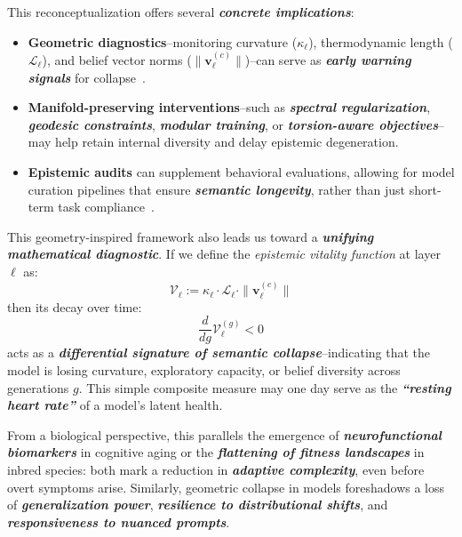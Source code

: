 \vspace{0.5em}
\noindent This reconceptualization offers several \textbf{\emph{concrete implications}}:

\begin{itemize}[leftmargin=1.5em]
    \item \textbf{Geometric diagnostics}--monitoring curvature ($\kappa_\ell$), thermodynamic length ($\mathcal{L}_\ell$), and belief vector norms ($\|\mathbf{v}_\ell^{(c)}\|$)--can serve as \textbf{\emph{early warning signals}} for collapse~\citep{wu2024seamless}.
    
    \item \textbf{Manifold-preserving interventions}--such as \textbf{\emph{spectral regularization}}, \textbf{\emph{geodesic constraints}}, \textbf{\emph{modular training}}, or \textbf{\emph{torsion-aware objectives}}--may help retain internal diversity and delay epistemic degeneration.
    
    \item \textbf{Epistemic audits} can supplement behavioral evaluations, allowing for model curation pipelines that ensure \textbf{\emph{semantic longevity}}, rather than just short-term task compliance~\citep{bommasani2023foundation, ganguli2023reducing}.
\end{itemize}

\vspace{0.5em}
\noindent This geometry-inspired framework also leads us toward a \textbf{\emph{unifying mathematical diagnostic}}. If we define the \emph{epistemic vitality function} at layer $\ell$ as:
\[
\mathcal{V}_\ell := \kappa_\ell \cdot \mathcal{L}_\ell \cdot \|\mathbf{v}_\ell^{(c)}\|
\]
then its decay over time:
\[
\frac{d}{dg} \mathcal{V}_\ell^{(g)} < 0
\]
acts as a \textbf{\emph{differential signature of semantic collapse}}--indicating that the model is losing curvature, exploratory capacity, or belief diversity across generations $g$. This simple composite measure may one day serve as the \textbf{\emph{“resting heart rate”}} of a model’s latent health.

\vspace{0.5em}
\noindent From a biological perspective, this parallels the emergence of \textbf{\emph{neurofunctional biomarkers}} in cognitive aging or the \textbf{\emph{flattening of fitness landscapes}} in inbred species: both mark a reduction in \textbf{\emph{adaptive complexity}}, even before overt symptoms arise. Similarly, geometric collapse in models foreshadows a loss of \textbf{\emph{generalization power}}, \textbf{\emph{resilience to distributional shifts}}, and \textbf{\emph{responsiveness to nuanced prompts}}.

